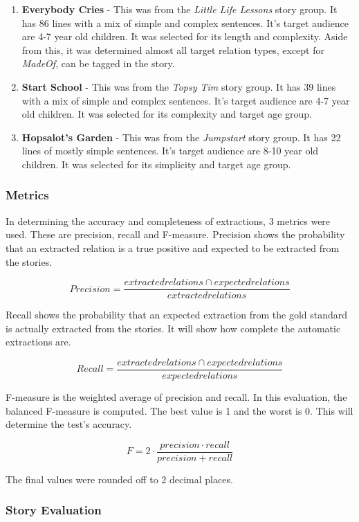 \begin{enumerate}
\item \textbf{Everybody Cries} - This was from the \textit{Little Life Lessons} story group. It has 86 lines with a mix of simple and complex sentences. It's target audience are 4-7 year old children. It was selected for its length and complexity. Aside from this, it was determined almost all target relation types, except for \textit{MadeOf}, can be tagged in the story. 
\item \textbf{Start School} - This was from the \textit{Topsy Tim} story group. It has 39 lines with a mix of simple and complex sentences. It's target audience are 4-7 year old children. It was selected for its complexity and target age group. 
\item \textbf{Hopsalot's Garden} - This was from the \textit{Jumpstart} story group. It has 22 lines of mostly simple sentences. It's target audience are 8-10 year old children. It was selected for its simplicity and target age group. 
\end{enumerate}

\subsubsection*{Metrics}

In determining the accuracy and completeness of extractions, 3 metrics were used. These are precision, recall and F-measure. Precision shows the probability that an extracted relation is a true positive and expected to be extracted from the stories. 

\[Precision = \frac{extracted relations \cap expected relations}{extracted relations}\]

Recall shows the probability that an expected extraction from the gold standard is actually extracted from the stories. It will show how complete the automatic extractions are.

\[Recall = \frac{extracted relations \cap expected relations}{expected relations}\]

F-measure is the weighted average of precision and recall. In this evaluation, the balanced F-measure is computed. The best value is 1 and the worst is 0. This will determine the test's accuracy.

\[F = 2 \cdot \frac{precision \cdot recall}{precision + recall}\]

The final values were rounded off to 2 decimal places.

\subsubsection{Story Evaluation}

